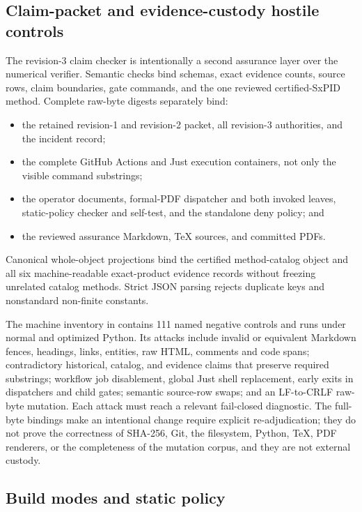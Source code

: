 \documentclass[11pt]{article}
\theoremstyle{definition}
\begin{document}
\subsection{Claim-packet and evidence-custody hostile controls}

The revision-3 claim checker is intentionally a second assurance layer over the numerical
verifier.  Semantic checks bind schemas, exact evidence counts, source rows, claim boundaries,
gate commands, and the one reviewed certified-SxPID method.  Complete raw-byte digests separately
bind:
\begin{itemize}[leftmargin=*]
  \item the retained revision-1 and revision-2 packet, all revision-3 authorities, and the
  incident record;
  \item the complete GitHub Actions and Just execution containers, not only the visible command
  substrings;
  \item the operator documents, formal-PDF dispatcher and both invoked leaves, static-policy
  checker and self-test, and the standalone deny policy; and
  \item the reviewed assurance Markdown, TeX sources, and committed PDFs.
\end{itemize}
Canonical whole-object projections bind the certified method-catalog object and all six
machine-readable exact-product evidence records without freezing unrelated catalog methods.
Strict JSON parsing rejects duplicate keys and nonstandard non-finite constants.

The machine inventory in
 contains 111 named negative controls and
runs under normal and optimized Python.  Its attacks include invalid or equivalent Markdown
fences, headings, links, entities, raw HTML, comments and code spans; contradictory historical,
catalog, and evidence claims that preserve required substrings; workflow job disablement, global
Just shell replacement, early exits in dispatchers and child gates; semantic source-row swaps;
and an LF-to-CRLF raw-byte mutation.  Each attack must reach a relevant fail-closed diagnostic.
The full-byte bindings make an intentional change require explicit re-adjudication; they do not
prove the correctness of SHA-256, Git, the filesystem, Python, TeX, PDF renderers, or the
completeness of the mutation corpus, and they are not external custody.

\subsection{Build modes and static policy}
\end{document}
